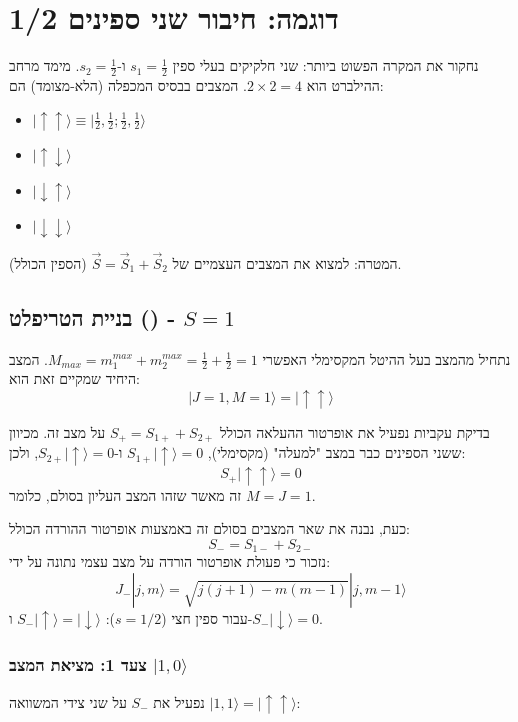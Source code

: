 \section{דוגמה: חיבור שני ספינים 1/2}

נחקור את המקרה הפשוט ביותר: שני חלקיקים בעלי ספין $s_1 = \frac{1}{2}$ ו-$s_2 = \frac{1}{2}$.
מימד מרחב ההילברט הוא $2 \times 2 = 4$.
המצבים בבסיס המכפלה (הלא-מצומד) הם:
\begin{itemize}
    \item $|\uparrow \uparrow\rangle \equiv |\frac{1}{2}, \frac{1}{2}; \frac{1}{2}, \frac{1}{2}\rangle$
    \item $|\uparrow \downarrow\rangle$
    \item $|\downarrow \uparrow\rangle$
    \item $|\downarrow \downarrow\rangle$
\end{itemize}

המטרה: למצוא את המצבים העצמיים של $\vec{S} = \vec{S}_1 + \vec{S}_2$ (הספין הכולל).

\subsection{בניית הטריפלט () - $S=1$}

נתחיל מהמצב בעל ההיטל המקסימלי האפשרי $M_{max} = m_1^{max} + m_2^{max} = \frac{1}{2} + \frac{1}{2} = 1$.
המצב היחיד שמקיים זאת הוא:
\[
|J=1, M=1\rangle = |\uparrow \uparrow\rangle
\]
\begin{notebox}{בדיקת עקביות}
נפעיל את אופרטור ההעלאה הכולל $S_+ = S_{1+} + S_{2+}$ על מצב זה.
מכיוון ששני הספינים כבר במצב "למעלה" (מקסימלי), $S_{1+}|\uparrow\rangle = 0$ ו-$S_{2+}|\uparrow\rangle = 0$, ולכן:
\[
S_+ |\uparrow \uparrow\rangle = 0
\]
זה מאשר שזהו המצב העליון בסולם, כלומר $M=J=1$.
\end{notebox}

כעת, נבנה את שאר המצבים בסולם זה באמצעות אופרטור ההורדה הכולל:
\[
S_- = S_{1-} + S_{2-}
\]
נזכור כי פעולת אופרטור הורדה על מצב עצמי נתונה על ידי:
\[
J_- |j, m\rangle = \sqrt{j(j+1) - m(m-1)} |j, m-1\rangle
\]
עבור ספין חצי ($s=1/2$): $S_-|\uparrow\rangle = |\downarrow\rangle$ ו-$S_-|\downarrow\rangle = 0$.

\subsubsection*{צעד 1: מציאת המצב $|1, 0\rangle$}
נפעיל את $S_-$ על שני צידי המשוואה $|1, 1\rangle = |\uparrow \uparrow\rangle$:

